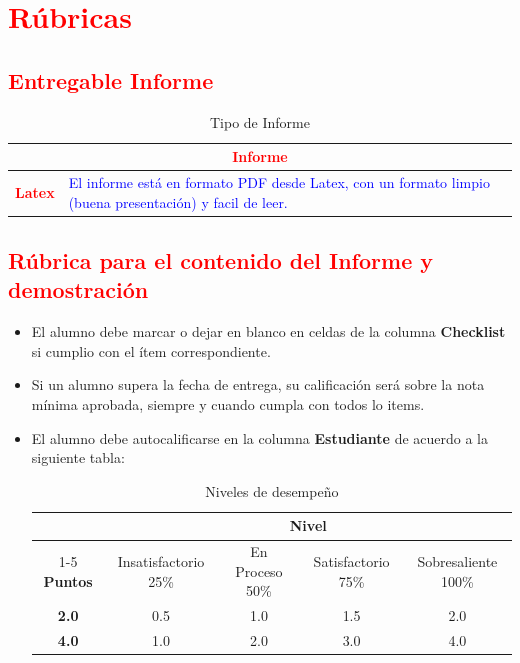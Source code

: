 \documentclass{article}
\begin{document}
\begin{itemize}
\begin{itemize}
	\end{itemize}		

	\section{\textcolor{red}{Rúbricas}}
	
	\subsection{\textcolor{red}{Entregable Informe}}
	\begin{table}[H]
		\caption{Tipo de Informe}
		\setlength{\tabcolsep}{0.5em} %
		{\renewcommand{\arraystretch}{1.5}%
		\begin{tabular}{|p{3cm}|p{12cm}|}
			\hline
			\multicolumn{2}{|c|}{\textbf{\textcolor{red}{Informe}}}  \\
			\hline 
			\textbf{\textcolor{red}{Latex}} & \textcolor{blue}{El informe está en formato PDF desde Latex,  con un formato limpio (buena presentación) y facil de leer.}   \\ 
			\hline 
			
			
		\end{tabular}
	}
	\end{table}
	
	\clearpage
	
	\subsection{\textcolor{red}{Rúbrica para el contenido del Informe y demostración}}
	\begin{itemize}			
		\item El alumno debe marcar o dejar en blanco en celdas de la columna \textbf{Checklist} si cumplio con el ítem correspondiente.
		\item Si un alumno supera la fecha de entrega,  su calificación será sobre la nota mínima aprobada, siempre y cuando cumpla con todos lo items.
		\item El alumno debe autocalificarse en la columna \textbf{Estudiante} de acuerdo a la siguiente tabla:
	
		\begin{table}[ht]
			\caption{Niveles de desempeño}
			\begin{center}
			\begin{tabular}{ccccc}
    			\hline
    			 & \multicolumn{4}{c}{Nivel}\\
    			\cline{1-5}
    			\textbf{Puntos} & Insatisfactorio 25\%& En Proceso 50\% & Satisfactorio 75\% & Sobresaliente 100\%\\
    			\textbf{2.0}&0.5&1.0&1.5&2.0\\
    			\textbf{4.0}&1.0&2.0&3.0&4.0\\
    		\hline
			\end{tabular}
		\end{center}
	\end{table}	
	

\end{itemize}
\end{itemize}
\end{document}
